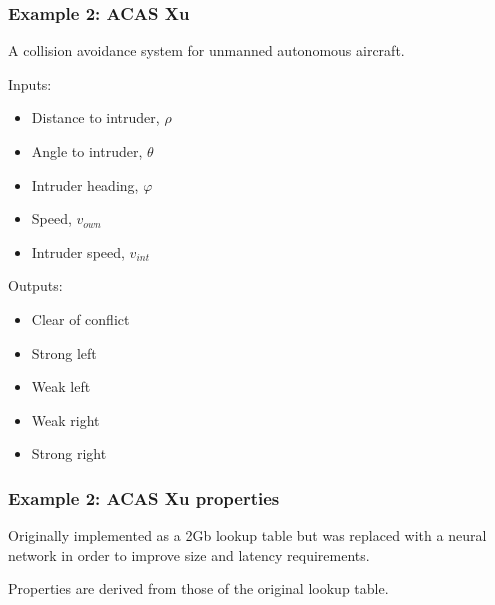 \documentclass[t,compress,aspectratio=169]{beamer}
\begin{document}
\begin{frame}
\frametitle{Example 2: ACAS Xu}

\vspace{-1em}

A collision avoidance system for unmanned autonomous aircraft.


\pause

\vspace{-1em}

Inputs:
\begin{itemize}
\setlength\itemsep{-0.1em}
\item Distance to intruder, $\rho$
\item Angle to intruder, $\theta$
\item Intruder heading, $\varphi$
\item Speed, $v_{own}$
\item Intruder speed, $v_{int}$
\end{itemize}

\pause
Outputs:
\begin{itemize}
\setlength\itemsep{-0.1em}
\item Clear of conflict
\item Strong left
\item Weak left
\item Weak right
\item Strong right
\end{itemize}
\end{frame}


\begin{frame}
\frametitle{Example 2: ACAS Xu properties}
Originally implemented as a 2Gb lookup table but was replaced with a neural network in order to improve size and latency requirements.

\pause
\vspace{1em}

Properties are derived from those of the original lookup table.
\end{frame}
\end{document}
